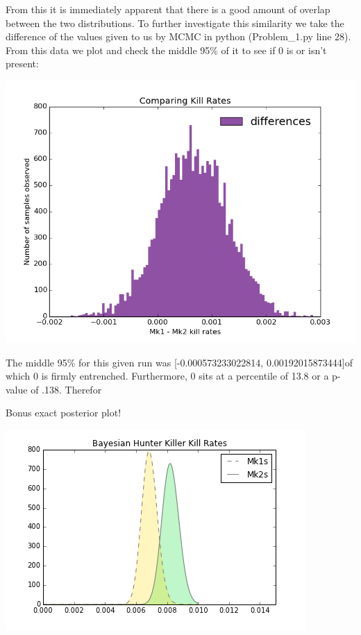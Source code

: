 \documentclass[]{article}
\begin{document}
\begin{enumerate}
From this it is immediately apparent that there is a good amount of overlap between the two distributions. To further investigate this similarity we take the difference of the values given to us by MCMC in python (Problem\_1.py line 28). From this data we plot and check the middle 95\% of it to see if 0 is or isn't present:

\centerline{\includegraphics[scale = 0.6]{differences.png}}

The middle 95\% for this given run was [-0.000573233022814, 0.00192015873444]of which 0 is firmly entrenched. Furthermore, 0 sits at a percentile of 13.8 or a p-value of .138. Therefor 

\vspace{1em}
{\large Bonus exact posterior plot!}


\centerline{\includegraphics[scale = 0.6]{BHK_Plots.png}}


\end{enumerate}
\end{document}
